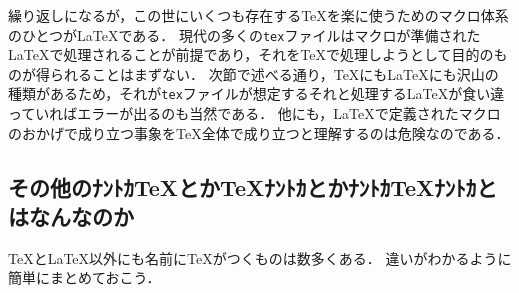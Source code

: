 \documentclass[./main]{subfiles}
\begin{document}
繰り返しになるが，この世にいくつも存在する\TeX を楽に使うためのマクロ体系のひとつが\LaTeX である．
現代の多くの\verb|tex|ファイルはマクロが準備された\LaTeX で処理されることが前提であり，それを\TeX で処理しようとして目的のものが得られることはまずない．
次節で述べる通り，\TeX にも\LaTeX にも沢山の種類があるため，それが\verb|tex|ファイルが想定するそれと処理する\LaTeX が食い違っていればエラーが出るのも当然である．
他にも，\LaTeX で定義されたマクロのおかげで成り立つ事象を\TeX 全体で成り立つと理解するのは危険なのである．

\subsection{その他のﾅﾝﾄｶ\TeX とか\TeX ﾅﾝﾄｶとかﾅﾝﾄｶ\TeX ﾅﾝﾄｶとはなんなのか}
\noindent
\TeX と\LaTeX 以外にも名前に\TeX がつくものは数多くある．
違いがわかるように簡単にまとめておこう\supercite{TeXwiki}．
\end{document}
